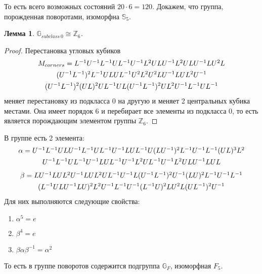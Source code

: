 \documentclass[utf8,a4paper,draft]{article}
\newtheorem{lemma_cub}{Лемма}
\newtheorem*{def_cub}{Определение}
\begin{document}
То есть всего возможных состояний $20\cdot 6=120$.
Докажем, что группа, порожденная поворотами, изоморфна $\mathbb{S}_5$.
\begin{lemma_cub}
$\mathbb{G}_{subclass~0} \cong \mathbb{Z}_6$.
\end{lemma_cub}
\begin{proof}
Перестановка угловых кубиков
\begin{multline*}
$$
M_{corners}=L^{-1}U^{-1}L^{-1}UL^{-1}U^{-1}L^2ULU^{-1}L^2ULU^{-1}LU^2L \\
	(U^{-1}L^{-1})^2L^{-1}ULUL^{-1}U^2L^2U^2LU^{-1}LUL^2U^{-1} \\
		(U^{-1}L^{-1})^2(UL)^2UL^{-1}UL(U^{-1}L^{-1})^2UL^2U^{-1}L^{-1}UL^{-1}
$$
\end{multline*}
меняет перестановку из подкласса 0 на другую и меняет 2 центральных кубика местами. Она имеет порядок 6 и перебирает все элементы из подкласса 0, то есть является порождающим элементом группы $\mathbb{Z}_6$.
\end{proof}
В группе есть 2 элемента:
\begin{multline*} %
$$
\alpha=U^{-1}L^{-1}ULU^{-1}L^{-1}UL^{-1}U^{-1}LUL^{-1}U(LU^{-1})^2L^{-1}U^{-1}L^{-1}(UL)^3L^2 \\
	U^{-1}L^{-1}UL^{-1}U^{-1}LUL^{-1}U^{-1}L^2UL^{-1}U^{-1}L^2ULU^{-1}LUL
$$
\end{multline*}
\begin{multline*} %
$$
\beta=LU^{-1}LUL^2U^{-1}LUL^2UL^{-1}U^{-1}L(U^{-1}L^{-1})^2U^{-1}(LU)^2L^{-1}U^{-1}L^{-1}\\ 
		(L^{-1}ULU^{-1}LU)^2L^2U^{-1}L^{-1}U^{-1}(L^{-1}U)^2LU^2L(UL^{-1})^2U^{-1}
$$
\end{multline*}
Для них выполняются следующие свойства:
\begin{enumerate}
\item $\alpha^5=e$
\item $\beta^4=e$
\item $\beta\alpha\beta^{-1}=\alpha^2$
\end{enumerate}
То есть в группе поворотов содержится подгруппа $\mathbb{G}_F$, изоморфная $F_5$.
\end{document}
